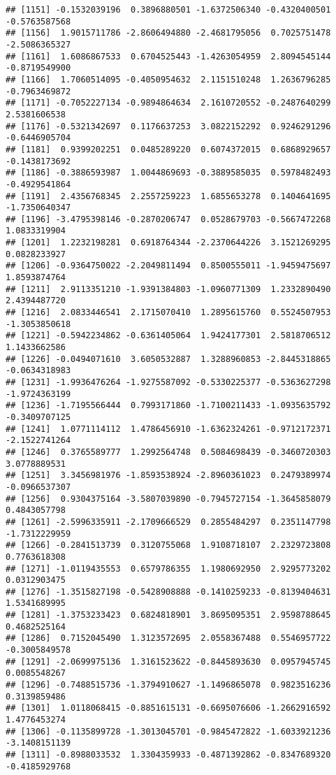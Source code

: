 \documentclass[
]{article}
\begin{document}
\begin{verbatim}
## [1151] -0.1532039196  0.3896880501 -1.6372506340 -0.4320400501 -0.5763587568
## [1156]  1.9015711786 -2.8606494880 -2.4681795056  0.7025751478 -2.5086365327
## [1161]  1.6086867533  0.6704525443 -1.4263054959  2.8094545144 -0.8719549900
## [1166]  1.7060514095 -0.4050954632  2.1151510248  1.2636796285 -0.7963469872
## [1171] -0.7052227134 -0.9894864634  2.1610720552 -0.2487640299  2.5381606538
## [1176] -0.5321342697  0.1176637253  3.0822152292  0.9246291296 -0.6446905704
## [1181]  0.9399202251  0.0485289220  0.6074372015  0.6868929657 -0.1438173692
## [1186] -0.3886593987  1.0044869693 -0.3889585035  0.5978482493 -0.4929541864
## [1191]  2.4356768345  2.2557259223  1.6855653278  0.1404641695 -1.7350640347
## [1196] -3.4795398146 -0.2870206747  0.0528679703 -0.5667472268  1.0833319904
## [1201]  1.2232198281  0.6918764344 -2.2370644226  3.1521269295  0.0828233927
## [1206] -0.9364750022 -2.2049811494  0.8500555011 -1.9459475697  1.8593874764
## [1211]  2.9113351210 -1.9391384803 -1.0960771309  1.2332890490  2.4394487720
## [1216]  2.0833446541  2.1715070410  1.2895615760  0.5524507953 -1.3053850618
## [1221] -0.5942234862 -0.6361405064  1.9424177301  2.5818706512  1.1433662586
## [1226] -0.0494071610  3.6050532887  1.3288960853 -2.8445318865 -0.0634318983
## [1231] -1.9936476264 -1.9275587092 -0.5330225377 -0.5363627298 -1.9724363199
## [1236] -1.7195566444  0.7993171860 -1.7100211433 -1.0935635792 -0.3409707125
## [1241]  1.0771114112  1.4786456910 -1.6362324261 -0.9712172371 -2.1522741264
## [1246]  0.3765589777  1.2992564748  0.5084698439 -0.3460720303  3.0778889531
## [1251]  3.3456981976 -1.8593538924 -2.8960361023  0.2479389974 -0.0966537307
## [1256]  0.9304375164 -3.5807039890 -0.7945727154 -1.3645858079  0.4843057798
## [1261] -2.5996335911 -2.1709666529  0.2855484297  0.2351147798 -1.7312229959
## [1266] -0.2841513739  0.3120755068  1.9108718107  2.2329723808  0.7763618308
## [1271] -1.0119435553  0.6579786355  1.1980692950  2.9295773202  0.0312903475
## [1276] -1.3515827198 -0.5428908888 -0.1410259233 -0.8139404631  1.5341689995
## [1281] -1.3753233423  0.6824818901  3.8695095351  2.9598788645  0.4682525164
## [1286]  0.7152045490  1.3123572695  2.0558367488  0.5546957722 -0.3005849578
## [1291] -2.0699975136  1.3161523622 -0.8445893630  0.0957945745  0.0085548267
## [1296] -0.7488515736 -1.3794910627 -1.1496865078  0.9823516236  0.3139859486
## [1301]  1.0118068415 -0.8851615131 -0.6695076606 -1.2662916592  1.4776453274
## [1306] -0.1135899728 -1.3013045701 -0.9845472822 -1.6033921236 -3.1408151139
## [1311] -0.8988033532  1.3304359933 -0.4871392862 -0.8347689320 -0.4185929768

\end{verbatim}
\end{document}
